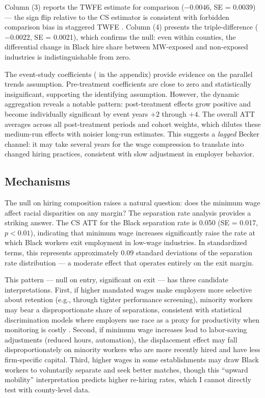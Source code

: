\documentclass[12pt]{article}
\begin{document}
Column (3) reports the TWFE estimate for comparison ($-0.0046$, SE = 0.0039) --- the sign flip relative to the CS estimator is consistent with forbidden comparison bias in staggered TWFE \citep{goodman2021difference}. Column (4) presents the triple-difference ($-0.0022$, SE = 0.0021), which confirms the null: even within counties, the differential change in Black hire share between MW-exposed and non-exposed industries is indistinguishable from zero.

The event-study coefficients ( in the appendix) provide evidence on the parallel trends assumption. Pre-treatment coefficients are close to zero and statistically insignificant, supporting the identifying assumption. However, the dynamic aggregation reveals a notable pattern: post-treatment effects grow positive and become individually significant by event years $+2$ through $+4$. The overall ATT averages across all post-treatment periods and cohort weights, which dilutes these medium-run effects with noisier long-run estimates. This suggests a \textit{lagged} Becker channel: it may take several years for the wage compression to translate into changed hiring practices, consistent with slow adjustment in employer behavior.

\subsection{Mechanisms}

The null on hiring composition raises a natural question: does the minimum wage affect racial disparities on any margin? The separation rate analysis provides a striking answer. The CS ATT for the Black separation rate is 0.050 (SE = 0.017, $p < 0.01$), indicating that minimum wage increases significantly raise the rate at which Black workers exit employment in low-wage industries. In standardized terms, this represents approximately 0.09 standard deviations of the separation rate distribution --- a moderate effect that operates entirely on the exit margin.

This pattern --- null on entry, significant on exit --- has three candidate interpretations. First, if higher mandated wages make employers more selective about retention (e.g., through tighter performance screening), minority workers may bear a disproportionate share of separations, consistent with statistical discrimination models where employers use race as a proxy for productivity when monitoring is costly \citep{lang2020racial}. Second, if minimum wage increases lead to labor-saving adjustments (reduced hours, automation), the displacement effect may fall disproportionately on minority workers who are more recently hired and have less firm-specific capital. Third, higher wages in some establishments may draw Black workers to voluntarily separate and seek better matches, though this ``upward mobility'' interpretation predicts higher re-hiring rates, which I cannot directly test with county-level data.
\end{document}
